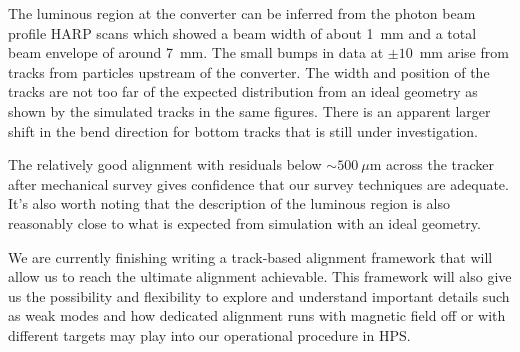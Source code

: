 The luminous region at the converter can be inferred from the photon beam profile HARP 
scans which showed a beam width of about 1~mm 
and a total beam envelope of around 7~mm. The small bumps in data at $\pm10$~mm 
arise from tracks from particles upstream of the converter. The width and position of the tracks 
are not too far of the expected distribution from an ideal geometry as shown by the simulated 
tracks in the same figures. There is an apparent larger shift in the bend direction for bottom tracks 
that is still under investigation. 

The relatively good alignment with residuals below $\sim 500~\mu$m across the tracker 
after mechanical survey gives confidence that our survey techniques are adequate. 
It's also worth noting that the description of the luminous region is also reasonably close to what 
is expected from simulation with an ideal geometry. 

We are currently finishing writing a track-based alignment framework that will allow us to reach 
the ultimate alignment achievable. This framework will also give us the possibility and 
flexibility  to explore and understand important details such as weak modes and how dedicated alignment runs with magnetic field off or with different targets may play into our operational 
procedure in HPS.

